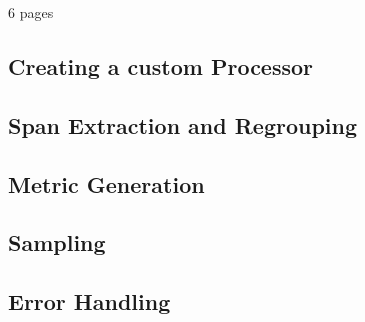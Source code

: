6 pages

\subsection{Creating a custom Processor}
\subsection{Span Extraction and Regrouping}
\subsection{Metric Generation}
\subsection{Sampling}
\subsection{Error Handling}